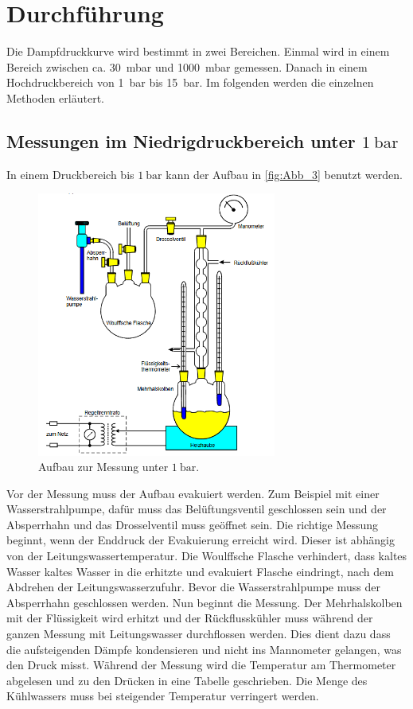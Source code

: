 \section{Durchführung}
\label{sec:Durchführung}

Die Dampfdruckkurve wird bestimmt in zwei Bereichen.
Einmal wird in einem Bereich zwischen ca. \qty{30}{\milli\bar} und \qty{1000}{\milli\bar} gemessen.
Danach in einem Hochdruckbereich von \qty{1}{\bar} bis \qty{15}{\bar}.
Im folgenden werden die einzelnen Methoden erläutert.

\subsection{Messungen im Niedrigdruckbereich unter $\qty{1}{\bar}$} %
\label{sub:M_Niedrigdruckbereich}
In einem Druckbereich bis $\qty{1}{\bar}$ kann der Aufbau in \autoref{fig:Abb_3} benutzt werden.
\begin{figure}[H]
    \centering
    \includegraphics[width=0.7\textwidth]{build/Abb_3.PNG}
    \caption {Aufbau zur Messung unter $\qty{1}{\bar}$.\cite{v203}}
    \label{fig:Abb_3}
\end{figure}
Vor der Messung muss der Aufbau evakuiert werden.
Zum Beispiel mit einer Wasserstrahlpumpe, dafür muss das Belüftungsventil geschlossen sein und der Absperrhahn und das Drosselventil muss geöffnet sein.
Die richtige Messung beginnt, wenn der Enddruck der Evakuierung erreicht wird.
Dieser ist abhängig von der Leitungswassertemperatur.
Die Woulffsche Flasche verhindert, dass kaltes Wasser kaltes Wasser in die erhitzte und evakuiert Flasche eindringt, nach dem Abdrehen der Leitungswasserzufuhr.
Bevor die Wasserstrahlpumpe muss der Absperrhahn geschlossen werden.
Nun beginnt die Messung.
Der Mehrhalskolben mit der Flüssigkeit wird erhitzt und der Rückflusskühler muss während der ganzen Messung mit Leitungswasser durchflossen werden.
Dies dient dazu dass die aufsteigenden Dämpfe kondensieren und nicht ins Mannometer gelangen, was den Druck misst.
Während der Messung wird die Temperatur am Thermometer abgelesen und zu den Drücken in eine Tabelle geschrieben.
Die Menge des Kühlwassers muss bei steigender Temperatur verringert werden.
